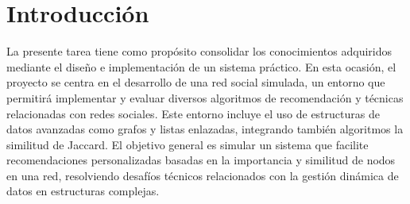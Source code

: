 \section{Introducción}
La presente tarea tiene como propósito consolidar los conocimientos adquiridos mediante el diseño e implementación de un sistema práctico. En esta ocasión, el proyecto se centra en el desarrollo de una red social simulada, un entorno que permitirá implementar y evaluar diversos algoritmos de recomendación y técnicas relacionadas con redes sociales. Este entorno incluye el uso de estructuras de datos avanzadas como grafos y listas enlazadas, integrando también algoritmos la similitud de Jaccard. El objetivo general es simular un sistema que facilite recomendaciones personalizadas basadas en la importancia y similitud de nodos en una red, resolviendo desafíos técnicos relacionados con la gestión dinámica de datos en estructuras complejas.